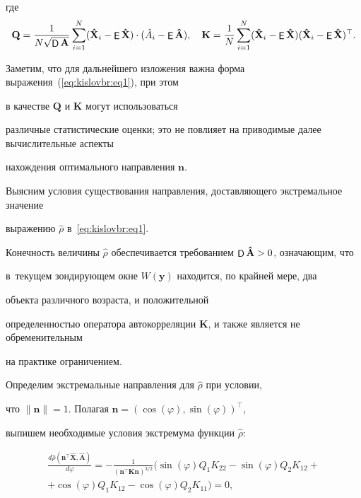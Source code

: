 где $$\mathbf{Q}=\dfrac{1}{N\sqrt{ \mathop{\sf D} \mathbf{A}}}\sum\limits_{i=1}^N (\mathbf{\hat X}_i- \mathop{\sf E} \mathbf{\hat X})\cdot(\hat A_i- \mathop{\sf E} \mathbf{\hat A}),\quad  

\mathbf{K}=\dfrac{1}{N}\sum\limits_{i=1}^N (\mathbf{\hat X}_i- \mathop{\sf E} \mathbf{\hat X})(\mathbf{\hat X}_i - \mathop{\sf E} \mathbf{\hat X})^\top .$$



Заметим, что для дальнейшего изложения важна форма выражения~(\ref{eq:kislovbr:eq1}), при этом

в качестве $\mathbf{Q}$ и $\mathbf{K}$ могут использоваться 

различные статистические оценки; это не повлияет на приводимые далее вычислительные аспекты 

нахождения оптимального направления $\mathbf{n}$.



Выясним условия существования  направления, доставляющего экстремальное значение

выражению $\hat{\rho}$ в~\eqref{eq:kislovbr:eq1}.



Конечность величины $\hat{\rho}$ обеспечивается требованием $ \mathop{\sf D} \mathbf{\hat A}>0$, означающим, что

в~текущем зондирующем окне $W(\mathbf{y})$ находится, по крайней мере, два 

объекта различного возраста, и положительной  

определенностью оператора автокорреляции $\mathbf{K}$, и также является не обременительным

на практике ограничением.



Определим экстремальные направления для  $\hat{\rho}$ при условии, 

что $\|\mathbf{n}\|=1$. Полагая $\mathbf{n}=(\cos(\varphi),\sin(\varphi))^\top $, 

выпишем необходимые условия экстремума функции  $\hat{\rho}$:

\begin{multline}

\frac{d \hat{\rho}(\mathbf{n}^\top \mathbf{\hat X},\mathbf{\hat A})}{d\varphi}=

-\frac{1}{(\mathbf{n}^\top \mathbf{K}\mathbf{n})^{3/2}}  

\bigl

(\sin(\varphi)Q_1K_{22}-\sin(\varphi) Q_2K_{12}+ \\ + \cos(\varphi)Q_1K_{12}-\cos(\varphi)Q_2K_{11}\bigr)=0,

\label{eq:kislovbr:eq2}


\end{multline} 

